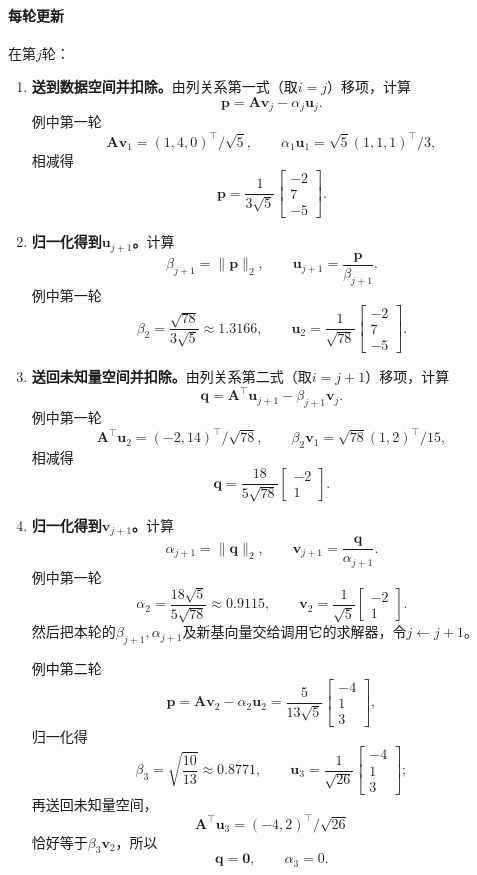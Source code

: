 \paragraph{每轮更新}
在第$j$轮：
\begin{enumerate}
 \item \textbf{送到数据空间并扣除。}由列关系第一式（取$i=j$）移项，计算
 \[
  \bm p=\bm A\bm v_j-\alpha_j\bm u_j .
 \]
 例中第一轮
 \[
  \bm A\bm v_1=(1,4,0)^\top/\sqrt5,\qquad \alpha_1\bm u_1=\sqrt5(1,1,1)^\top/3 ,
 \]
 相减得
 \[
  \bm p=\frac{1}{3\sqrt5}\begin{bmatrix}-2\\7\\-5\end{bmatrix}.
 \]

 \item \textbf{归一化得到$\bm u_{j+1}$。}计算
 \[
  \beta_{j+1}=\lVert\bm p\rVert_2,\qquad \bm u_{j+1}=\frac{\bm p}{\beta_{j+1}} .
 \]
 例中第一轮
 \[
  \beta_2=\frac{\sqrt{78}}{3\sqrt5}\approx1.3166,\qquad
  \bm u_2=\frac{1}{\sqrt{78}}\begin{bmatrix}-2\\7\\-5\end{bmatrix}.
 \]

 \item \textbf{送回未知量空间并扣除。}由列关系第二式（取$i=j+1$）移项，计算
 \[
  \bm q=\bm A^\top\bm u_{j+1}-\beta_{j+1}\bm v_j .
 \]
 例中第一轮
 \[
  \bm A^\top\bm u_2=(-2,14)^\top/\sqrt{78},\qquad \beta_2\bm v_1=\sqrt{78}(1,2)^\top/15 ,
 \]
 相减得
 \[
  \bm q=\frac{18}{5\sqrt{78}}\begin{bmatrix}-2\\1\end{bmatrix}.
 \]

 \item \textbf{归一化得到$\bm v_{j+1}$。}计算
 \[
  \alpha_{j+1}=\lVert\bm q\rVert_2,\qquad \bm v_{j+1}=\frac{\bm q}{\alpha_{j+1}} .
 \]
 例中第一轮
 \[
  \alpha_2=\frac{18\sqrt5}{5\sqrt{78}}\approx0.9115,\qquad
  \bm v_2=\frac{1}{\sqrt5}\begin{bmatrix}-2\\1\end{bmatrix}.
 \]
 然后把本轮的$\beta_{j+1},\alpha_{j+1}$及新基向量交给调用它的求解器，令$j\leftarrow j+1$。

 例中第二轮
 \[
  \bm p=\bm A\bm v_2-\alpha_2\bm u_2=\frac{5}{13\sqrt5}\begin{bmatrix}-4\\1\\3\end{bmatrix},
 \]
 归一化得
 \[
  \beta_3=\sqrt{\frac{10}{13}}\approx0.8771,\qquad
  \bm u_3=\frac1{\sqrt{26}}\begin{bmatrix}-4\\1\\3\end{bmatrix};
 \]
 再送回未知量空间，
 \[
  \bm A^\top\bm u_3=(-4,2)^\top/\sqrt{26}
 \]
 恰好等于$\beta_3\bm v_2$，所以
 \[
  \bm q=\bm 0,\qquad \alpha_3=0 .
 \]


\end{enumerate}
